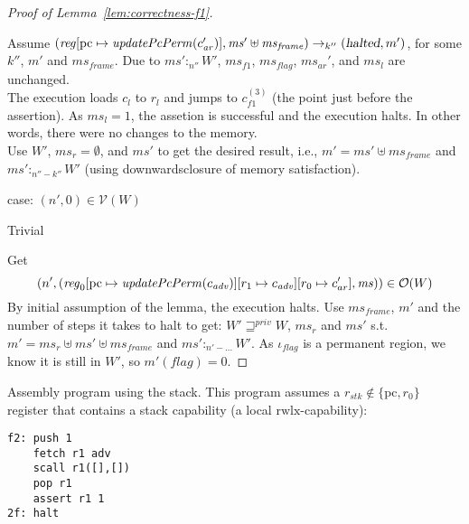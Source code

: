 \documentclass[a4paper]{article}
\newcommand{\update}[2]{[#1 \mapsto #2]}
\newcommand{\var}[1]{\mathit{#1}}
\newcommand{\hs}{\var{ms}}
\newcommand{\ms}{\hs}
\newcommand{\pcreg}{\mathrm{pc}}
\newcommand{\reg}{\var{reg}}
\newcommand{\heap}{\var{mem}}
\newcommand{\stk}{\var{stk}}
\newcommand{\flag}{\var{flag}}
\newcommand{\halted}{\textsl{halted}}
\newcommand{\plainfun}[2]{
  \ifthenelse{\equal{#2}{}}
  {\mathit{#1}}
  {\mathit{#1}(#2)}
}
\newcommand{\updatePcPerm}[1]{\plainfun{updatePcPerm}{#1}}
\newcommand{\futurestr}{\mathbin{\sqsupseteq}^{\var{priv}}}
\newcommand{\heapSat}[3][\heap]{#1 :_{#2} #3}
\newcommand{\asmType}{\plaindom{AsmType}}
\newcommand{\plaindom}[1]{\mathrm{#1}}
\newcommand{\intr}[2]{\mathcal{#1}}
\newcommand{\valueintr}[1]{\intr{V}{#1}}
\newcommand{\stdvr}{\valueintr{\asmType}}
\newcommand{\observations}{\mathcal{O}}
\newcommand{\npair}[2][n]{\left(#1,#2 \right)}
\newcommand{\plainperm}[1]{\mathrm{#1}}
\newcommand{\rwlx}{\plainperm{rwlx}}
\newcommand{\step}[1][]{\rightarrow_{#1}}
\begin{document}
\begin{proof}[Proof of Lemma~\ref{lem:correctness-f1}]
\begin{enumproof}[resume]
\begin{enumproof}
\begin{enumproof}
                      Assume $(\reg\update{\pcreg}{\updatePcPerm{c_{\var{ar}}'}},\ms' \uplus \ms_{\var{frame}}) \step[k''] (\halted, m')$, for some $k''$, $m'$ and $\ms_{\var{frame}}$. Due to $\heapSat[\ms']{n''}{W'}$, $\ms_{f1}$, $\ms_\flag$, $\ms_{\var{ar}}'$, and $\ms_l$ are unchanged. \\
                      The execution loads $c_l$ to $r_l$ and jumps to $c_{f1}^{(3)}$ (the point just before the assertion). As $\ms_l = 1$, the assetion is successful and the execution halts. In other words, there were no changes to the memory.\\
                      Use $W'$, $\ms_r = \emptyset$, and $\ms'$ to get the desired result, i.e., $m' = \ms' \uplus \ms_{\var{frame}}$ and $\heapSat[\ms']{n''-k''}{W'}$ (using downwardsclosure of memory satisfaction).          
                    \end{enumproof}
                  \item case: $\npair[n']{0} \in \stdvr(W)$
                    \begin{enumproof}
                    \item Trivial
                    \end{enumproof}
                  \end{enumproof}
                \end{enumproof}
                Get
                \[
                  \npair[n']{(\reg_0\update{\pcreg}{\updatePcPerm{c_{\var{adv}}}}\update{r_1}{c_{\var{adv}}}\update{r_0}{c_{ar}'},\ms)} \in \observations(W)
                \]
                By initial assumption of the lemma, the execution halts. Use $\ms_{\var{frame}}$, $m'$ and the number of steps it takes to halt to get:
                $W' \futurestr W$, $\ms_r$ and $\ms'$ s.t. $m' = \ms_r \uplus \ms' \uplus \ms_{\var{frame}}$ and $\heapSat[\ms']{n' - \dots}{W'}$. As $\iota_\flag$ is a permanent region, we know it is still in $W'$, so $m'(\flag) = 0$.
              \end{proof}


              Assembly program using the stack. This program assumes a $r_\stk \not\in \{\pcreg,r_0\}$ register that contains a stack capability (a local $\rwlx$-capability):
\begin{verbatim}
f2: push 1
    fetch r1 adv
    scall r1([],[])
    pop r1
    assert r1 1
2f: halt
\end{verbatim}
\end{document}
